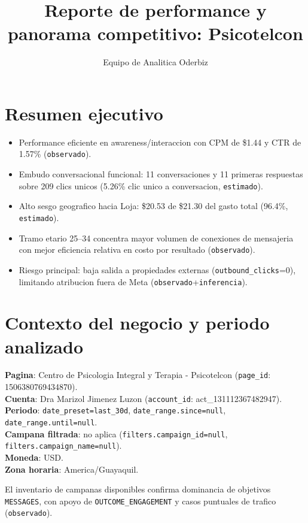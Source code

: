 \documentclass[9pt,a4paper,twocolumn,twoside]{tau-class/tau}
\title{Reporte de performance y panorama competitivo: Psicotelcon}
\author[a,1]{Equipo de Analitica Oderbiz}
\affil[a]{Unidad de Inteligencia Comercial}
\begin{document}
\maketitle
\thispagestyle{firststyle}

\section{Resumen ejecutivo}
\begin{itemize}
  \item Performance eficiente en awareness/interaccion con CPM de \$1.44 y CTR de 1.57\% (\texttt{observado}).
  \item Embudo conversacional funcional: 11 conversaciones y 11 primeras respuestas sobre 209 clics unicos (5.26\% clic unico a conversacion, \texttt{estimado}).
  \item Alto sesgo geografico hacia Loja: \$20.53 de \$21.30 del gasto total (96.4\%, \texttt{estimado}).
  \item Tramo etario 25--34 concentra mayor volumen de conexiones de mensajeria con mejor eficiencia relativa en costo por resultado (\texttt{observado}).
  \item Riesgo principal: baja salida a propiedades externas (\texttt{outbound\_clicks}=0), limitando atribucion fuera de Meta (\texttt{observado}+\texttt{inferencia}).
\end{itemize}

\section{Contexto del negocio y periodo analizado}
\textbf{Pagina}: Centro de Psicologia Integral y Terapia - Psicotelcon (\texttt{page\_id}: 1506380769434870).\\
\textbf{Cuenta}: Dra Marizol Jimenez Luzon (\texttt{account\_id}: act\_131112367482947).\\
\textbf{Periodo}: \texttt{date\_preset=last\_30d}, \texttt{date\_range.since=null}, \texttt{date\_range.until=null}.\\
\textbf{Campana filtrada}: no aplica (\texttt{filters.campaign\_id=null}, \texttt{filters.campaign\_name=null}).\\
\textbf{Moneda}: USD.\\
\textbf{Zona horaria}: America/Guayaquil.

El inventario de campanas disponibles confirma dominancia de objetivos \texttt{MESSAGES}, con apoyo de \texttt{OUTCOME\_ENGAGEMENT} y casos puntuales de trafico (\texttt{observado}).
\end{document}
